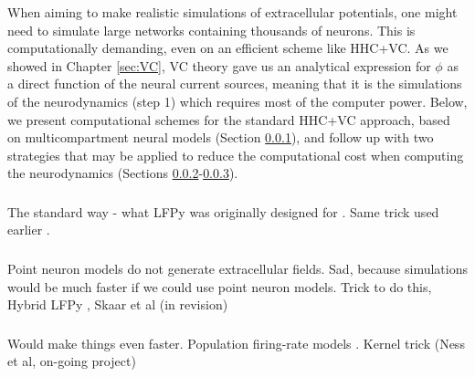 When aiming to make realistic simulations of extracellular potentials, one might need to simulate large networks containing thousands of neurons. This is computationally demanding, even on an efficient scheme like HHC+VC. As we showed in Chapter \ref{sec:VC}, VC theory gave us an analytical expression for $\phi$ as a direct function of the neural current sources, meaning that it is the simulations of the neurodynamics (step 1) which requires most of the computer power. Below, we present computational schemes for the standard HHC+VC approach, based on multicompartment neural models (Section \ref{sec:Schemes:LFPy}), and follow up with two strategies that may be applied to reduce the computational cost when computing the neurodynamics (Sections \ref{sec:Schemes:HybridLFPy}-\ref{sec:Schemes:KernelLFPy}).


\subsubsection{}
\label{sec:Schemes:LFPy}

The standard way - what LFPy was originally designed for \citep{Hagen2018}.
Same trick used earlier \citep{Holt1999}.


\subsubsection{}
\label{sec:Schemes:HybridLFPy}

Point neuron models do not generate extracellular fields. Sad, because simulations would be much faster if we could use point neuron models. Trick to do this, Hybrid LFPy \citep{Hagen2016}, Skaar et al (in revision)


\subsubsection{}
\label{sec:Schemes:KernelLFPy}

Would make things even faster. Population firing-rate models  \citep{Hagen2016}. Kernel trick (Ness et al, on-going project) 





